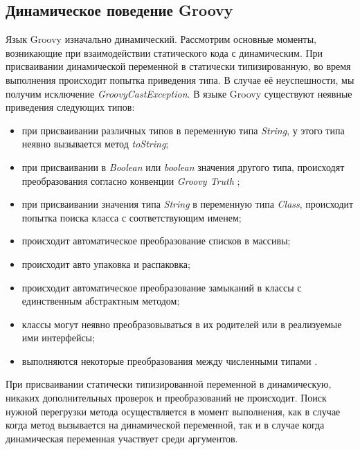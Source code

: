 \subsection{Динамическое поведение Groovy}

Язык Groovy изначально динамический. Рассмотрим основные моменты, возникающие при взаимодействии статического кода с динамическим. При присваивании динамической переменной в статически типизированную, во время выполнения происходит попытка приведения типа. В случае её неуспешности, мы получим исключение \textit{GroovyCastException}. В языке Groovy существуют неявные приведения следующих типов:

\begin{itemize}
\item при присваивании различных типов в переменную типа \textit{String}, у этого типа неявно вызывается метод \textit{toString};
\item при присваивании в \textit{Boolean} или \textit{boolean} значения другого типа, происходят преобразования согласно конвенции \textit{Groovy Truth} \cite{groovy:groovyTruth};
\item при присваивании значения типа \textit{String} в переменную типа \textit{Class}, происходит попытка поиска класса с соответствующим именем; 
\item происходит автоматическое преобразование списков в массивы;
\item происходит авто упаковка и распаковка\footnotemark;
\item происходит автоматическое преобразование замыканий в классы с единственным абстрактным методом;
\item классы могут неявно преобразовываться в их родителей или в реализуемые ими интерфейсы;
\item выполняются некоторые преобразования между численными типами \cite{groovy:semanticTypeCheckingAssignments}. 
\end{itemize}
При присваивании статически типизированной переменной в динамическую, никаких дополнительных проверок и преобразований не происходит.
Поиск нужной перегрузки метода осуществляется в момент выполнения, как в случае когда метод вызывается на динамической переменной, так и в случае когда динамическая переменная участвует среди аргументов.




